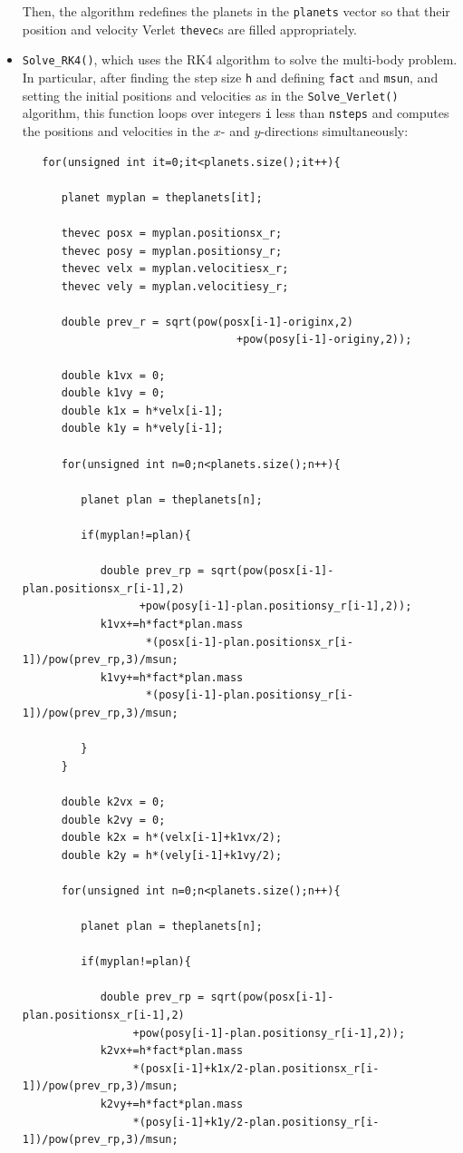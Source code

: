 \documentclass[12pt]{article}
\numberwithin{equation}{section}
\begin{document}
\begin{itemize}
Then, the algorithm redefines the planets in the \texttt{planets} vector so that their position and velocity Verlet \texttt{thevec}s are filled appropriately.
\item \texttt{Solve\_RK4()}, which uses the RK4 algorithm to solve the multi-body problem.  In particular, after finding the step size \texttt{h} and defining \texttt{fact} and \texttt{msun}, and setting the initial positions and velocities as in the \texttt{Solve\_Verlet()} algorithm, this function loops over integers \texttt{i} less than \texttt{nsteps} and computes the positions and velocities in the $x$- and $y$-directions simultaneously:

\begin{verbatim}
   for(unsigned int it=0;it<planets.size();it++){

      planet myplan = theplanets[it];
      
      thevec posx = myplan.positionsx_r;
      thevec posy = myplan.positionsy_r;
      thevec velx = myplan.velocitiesx_r;
      thevec vely = myplan.velocitiesy_r;
      
      double prev_r = sqrt(pow(posx[i-1]-originx,2)
                                 +pow(posy[i-1]-originy,2));

      double k1vx = 0;
      double k1vy = 0;
      double k1x = h*velx[i-1];
      double k1y = h*vely[i-1];

      for(unsigned int n=0;n<planets.size();n++){

         planet plan = theplanets[n];

         if(myplan!=plan){

            double prev_rp = sqrt(pow(posx[i-1]-plan.positionsx_r[i-1],2)
                  +pow(posy[i-1]-plan.positionsy_r[i-1],2));
            k1vx+=h*fact*plan.mass
                   *(posx[i-1]-plan.positionsx_r[i-1])/pow(prev_rp,3)/msun;
            k1vy+=h*fact*plan.mass
                   *(posy[i-1]-plan.positionsy_r[i-1])/pow(prev_rp,3)/msun;

         }
      }
      
      double k2vx = 0;
      double k2vy = 0;
      double k2x = h*(velx[i-1]+k1vx/2);
      double k2y = h*(vely[i-1]+k1vy/2);

      for(unsigned int n=0;n<planets.size();n++){

         planet plan = theplanets[n];

         if(myplan!=plan){

            double prev_rp = sqrt(pow(posx[i-1]-plan.positionsx_r[i-1],2)
                 +pow(posy[i-1]-plan.positionsy_r[i-1],2));
            k2vx+=h*fact*plan.mass
                 *(posx[i-1]+k1x/2-plan.positionsx_r[i-1])/pow(prev_rp,3)/msun;
            k2vy+=h*fact*plan.mass
                 *(posy[i-1]+k1y/2-plan.positionsy_r[i-1])/pow(prev_rp,3)/msun;


\end{verbatim}
\end{itemize}
\end{document}
